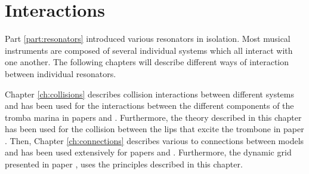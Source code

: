 \chapter*{Interactions}
Part \ref{part:resonators} introduced various resonators in isolation. Most musical instruments are composed of several individual systems which all interact with one another. The following chapters will describe different ways of interaction between individual resonators. 

Chapter \ref{ch:collisions} describes collision interactions between different systems and has been used for the interactions between the different components of the tromba marina in papers \citeP[D] and \citeP[E]. Furthermore, the theory described in this chapter has been used for the collision between the lips that excite the trombone in paper \citeP[H]. Then, Chapter \ref{ch:connections} describes various to connections between models and has been used extensively for papers \citeP[A] and \citeP[B]. Furthermore, the dynamic grid presented in paper \citeP[G], uses the principles described in this chapter.